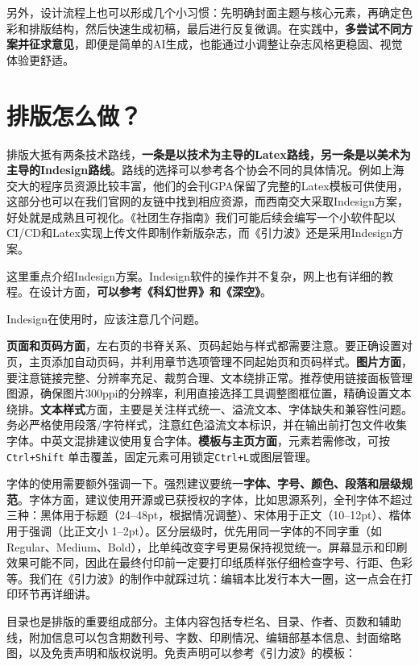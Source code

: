 另外，设计流程上也可以形成几个小习惯：先明确封面主题与核心元素，再确定色彩和排版结构，然后快速生成初稿，最后进行反复微调。在实践中，\textbf{多尝试不同方案并征求意见}，即便是简单的AI生成，也能通过小调整让杂志风格更稳固、视觉体验更舒适。

\section{排版怎么做？}\label{ux6392ux7248ux600eux4e48ux505a}

排版大抵有两条技术路线，\textbf{一条是以技术为主导的Latex路线，另一条是以美术为主导的Indesign路线}。路线的选择可以参考各个协会不同的具体情况。例如上海交大的程序员资源比较丰富，他们的会刊GPA保留了完整的Latex模板可供使用，这部分也可以在我们官网的友链中找到相应资源，而西南交大采取Indesign方案，好处就是成熟且可视化。《社团生存指南》我们可能后续会编写一个小软件配以CI/CD和Latex实现上传文件即制作新版杂志，而《引力波》还是采用Indesign方案。

这里重点介绍Indesign方案。Indesign软件的操作并不复杂，网上也有详细的教程。在设计方面，\textbf{可以参考《科幻世界》和《深空》}。

Indesign在使用时，应该注意几个问题。

\textbf{页面和页码方面}，左右页的书脊关系、页码起始与样式都需要注意。要正确设置对页，主页添加自动页码，并利用章节选项管理不同起始页和页码样式。\textbf{图片方面}，要注意链接完整、分辨率充足、裁剪合理、文本绕排正常。推荐使用链接面板管理图源，确保图片300ppi的分辨率，利用直接选择工具调整图框位置，精确设置文本绕排。\textbf{文本样式}方面，主要是关注样式统一、溢流文本、字体缺失和兼容性问题。务必严格使用段落/字符样式，注意红色溢流文本标识，并在输出前打包文件收集字体。中英文混排建议使用复合字体。\textbf{模板与主页方面}，元素若需修改，可按
\texttt{Ctrl+Shift}
单击覆盖，固定元素可用锁定\texttt{Ctrl+L}或图层管理。

字体的使用需要额外强调一下。强烈建议要统一\textbf{字体、字号、颜色、段落和层级规范}。字体方面，建议使用开源或已获授权的字体，比如思源系列，全刊字体不超过三种：黑体用于标题（24--48pt，根据情况调整）、宋体用于正文（10--12pt）、楷体用于强调（比正文小
1--2pt）。区分层级时，优先用同一字体的不同字重（如
Regular、Medium、Bold），比单纯改变字号更易保持视觉统一。屏幕显示和印刷效果可能不同，因此在最终付印前一定要打印纸质样张仔细检查字号、行距、色彩等。我们在《引力波》的制作中就踩过坑：编辑本比发行本大一圈，这一点会在打印环节再详细讲。

目录也是排版的重要组成部分。主体内容包括专栏名、目录、作者、页数和辅助线，附加信息可以包含期数刊号、字数、印刷情况、编辑部基本信息、封面缩略图，以及免责声明和版权说明。免责声明可以参考《引力波》的模板：


